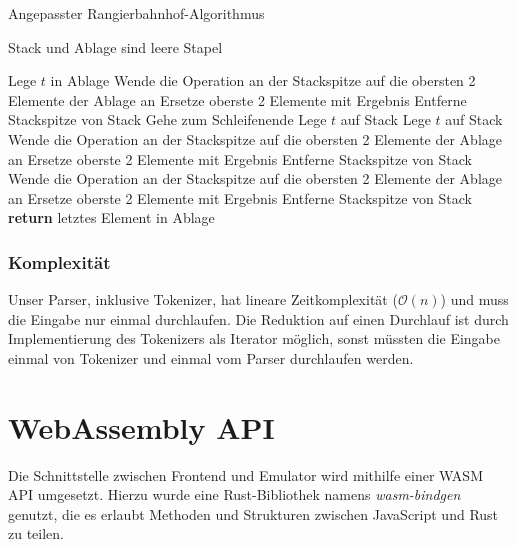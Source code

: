 \begin{algorithm}[H]
\caption{Angepasster Rangierbahnhof-Algorithmus}
\label{alg:shunt}
\begin{algorithmic}
\State Stack und Ablage sind leere Stapel

    \State Lege $t$ in Ablage
            \State Wende die Operation an der Stackspitze
            \State \quad auf die obersten 2 Elemente der Ablage an
            \State Ersetze oberste 2 Elemente mit Ergebnis
            \State Entferne Stackspitze von Stack
        \Else
            \State Gehe zum Schleifenende
        \EndIf
    \EndWhile
    \State Lege $t$ auf Stack
    \State Lege $t$ auf Stack
        \State Wende die Operation an der Stackspitze
        \State \quad auf die obersten 2 Elemente der Ablage an
        \State Ersetze oberste 2 Elemente mit Ergebnis
        \State Entferne Stackspitze von Stack
    \EndWhile
\EndIf
\EndFor
{}
    \State Wende die Operation an der Stackspitze
    \State \quad auf die obersten 2 Elemente der Ablage an
    \State Ersetze oberste 2 Elemente mit Ergebnis
    \State Entferne Stackspitze von Stack
\EndWhile
\State \textbf{return} letztes Element in Ablage
\end{algorithmic}
\end{algorithm}

\subsubsection{Komplexität}

Unser Parser, inklusive Tokenizer, hat lineare Zeitkomplexität ($\mathcal{O}(n)$) und muss die Eingabe nur einmal durchlaufen. Die Reduktion auf einen Durchlauf ist durch Implementierung des Tokenizers als Iterator möglich, sonst müssten die Eingabe einmal von Tokenizer und einmal vom Parser durchlaufen werden.

\section{WebAssembly API} \label{sec:wasmapi}

Die Schnittstelle zwischen Frontend und Emulator wird mithilfe einer \ac{WASM} \ac{API} umgesetzt. Hierzu wurde eine Rust-Bibliothek namens \textit{wasm-bindgen} genutzt, die es erlaubt Methoden und Strukturen zwischen JavaScript und Rust zu teilen.


